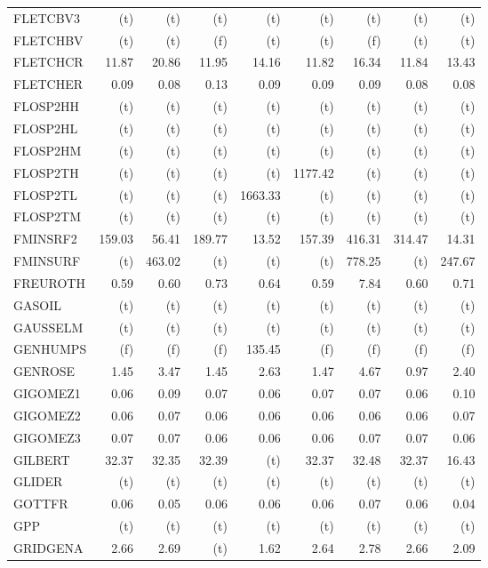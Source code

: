 \documentclass[11pt,twoside]{article}
\begin{document}
{\begin{longtable}[c]{|l|r|r|r|r|r|r|r|r|}
FLETCBV3 & (t) & (t) & (t) & (t) & (t) & (t) & (t) & (t) \\
FLETCHBV & (t) & (t) & (f) & (t) & (t) & (f) & (t) & (t) \\
FLETCHCR & 11.87 & 20.86 & 11.95 & 14.16 & 11.82 & 16.34 & 11.84 & 13.43 \\
FLETCHER & 0.09 & 0.08 & 0.13 & 0.09 & 0.09 & 0.09 & 0.08 & 0.08 \\
FLOSP2HH & (t) & (t) & (t) & (t) & (t) & (t) & (t) & (t) \\
FLOSP2HL & (t) & (t) & (t) & (t) & (t) & (t) & (t) & (t) \\
FLOSP2HM & (t) & (t) & (t) & (t) & (t) & (t) & (t) & (t) \\
FLOSP2TH & (t) & (t) & (t) & (t) & 1177.42 & (t) & (t) & (t) \\
FLOSP2TL & (t) & (t) & (t) & 1663.33 & (t) & (t) & (t) & (t) \\
FLOSP2TM & (t) & (t) & (t) & (t) & (t) & (t) & (t) & (t) \\
FMINSRF2 & 159.03 & 56.41 & 189.77 & 13.52 & 157.39 & 416.31 & 314.47 & 14.31 \\
FMINSURF & (t) & 463.02 & (t) & (t) & (t) & 778.25 & (t) & 247.67 \\
FREUROTH & 0.59 & 0.60 & 0.73 & 0.64 & 0.59 & 7.84 & 0.60 & 0.71 \\
GASOIL & (t) & (t) & (t) & (t) & (t) & (t) & (t) & (t) \\
GAUSSELM & (t) & (t) & (t) & (t) & (t) & (t) & (t) & (t) \\
GENHUMPS & (f) & (f) & (f) & 135.45 & (f) & (f) & (f) & (f) \\
GENROSE & 1.45 & 3.47 & 1.45 & 2.63 & 1.47 & 4.67 & 0.97 & 2.40 \\
GIGOMEZ1 & 0.06 & 0.09 & 0.07 & 0.06 & 0.07 & 0.07 & 0.06 & 0.10 \\
GIGOMEZ2 & 0.06 & 0.07 & 0.06 & 0.06 & 0.06 & 0.06 & 0.06 & 0.07 \\
GIGOMEZ3 & 0.07 & 0.07 & 0.06 & 0.06 & 0.06 & 0.07 & 0.07 & 0.06 \\
GILBERT & 32.37 & 32.35 & 32.39 & (t) & 32.37 & 32.48 & 32.37 & 16.43 \\
GLIDER & (t) & (t) & (t) & (t) & (t) & (t) & (t) & (t) \\
GOTTFR & 0.06 & 0.05 & 0.06 & 0.06 & 0.06 & 0.07 & 0.06 & 0.04 \\
GPP & (t) & (t) & (t) & (t) & (t) & (t) & (t) & (t) \\
GRIDGENA & 2.66 & 2.69 & (t) & 1.62 & 2.64 & 2.78 & 2.66 & 2.09 \\

\end{longtable}}
\end{document}
